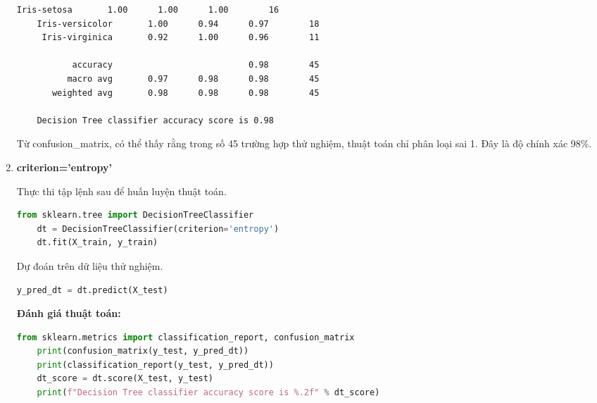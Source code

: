 \begin{enumerate}[label=(\alph*)]
\begin{center}
\begin{lstlisting}[basicstyle=\fontsize{11}{13}\selectfont\ttfamily]
        Iris-setosa       1.00      1.00      1.00        16
    Iris-versicolor       1.00      0.94      0.97        18
     Iris-virginica       0.92      1.00      0.96        11

           accuracy                           0.98        45
          macro avg       0.97      0.98      0.98        45
       weighted avg       0.98      0.98      0.98        45

    Decision Tree classifier accuracy score is 0.98
    \end{lstlisting}
    \end{center}

    Từ confusion\_matrix, có thể thấy rằng trong số 45 trường hợp
    thử nghiệm, thuật toán chỉ phân loại sai 1. Đây là độ chính xác 98\%.

    \item \textbf{criterion='entropy'}

    Thực thi tập lệnh sau để huấn luyện thuật toán.

    \begin{center}
    \begin{lstlisting}[language=Python,breaklines=true]
    from sklearn.tree import DecisionTreeClassifier
    dt = DecisionTreeClassifier(criterion='entropy')
    dt.fit(X_train, y_train)
    \end{lstlisting}
    \end{center}

    Dự đoán trên dữ liệu thử nghiệm.

    \begin{center}
    \begin{lstlisting}[language=Python,breaklines=true]
    y_pred_dt = dt.predict(X_test)
    \end{lstlisting}
    \end{center}

    \textbf{Đánh giá thuật toán:}

    \begin{center}
    \begin{lstlisting}[language=Python,breaklines=true]
    from sklearn.metrics import classification_report, confusion_matrix
    print(confusion_matrix(y_test, y_pred_dt))
    print(classification_report(y_test, y_pred_dt))
    dt_score = dt.score(X_test, y_test)
    print(f"Decision Tree classifier accuracy score is %.2f" % dt_score)
    \end{lstlisting}
    \end{center}


\end{enumerate}
